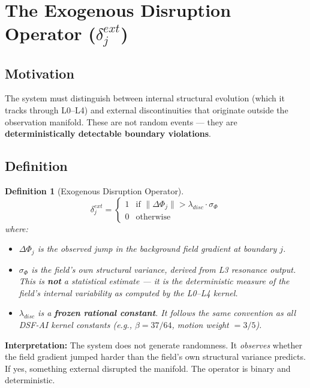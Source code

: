 \documentclass[11pt, a4paper]{article}
\newtheorem{definition}{Definition}[section]
\begin{document}
\section{The Exogenous Disruption Operator ($\delta_j^{ext}$)}

\subsection{Motivation}

The system must distinguish between internal structural evolution (which it
tracks through L0--L4) and external discontinuities that originate outside
the observation manifold. These are not random events --- they are
\textbf{deterministically detectable boundary violations}.

\subsection{Definition}

\begin{definition}[Exogenous Disruption Operator]
\begin{equation}
  \delta_j^{ext} = \begin{cases}
    1 & \text{if } \|\Delta \Phi_j\| > \lambda_{disc} \cdot \sigma_{\Phi} \\
    0 & \text{otherwise}
  \end{cases}
  \label{eq:delta}
\end{equation}
where:
\begin{itemize}[nosep]
  \item $\Delta \Phi_j$ is the observed jump in the background field gradient
        at boundary $j$.
  \item $\sigma_{\Phi}$ is the field's own structural variance, derived from
        L3 resonance output. This is \textbf{not} a statistical estimate ---
        it is the deterministic measure of the field's internal variability
        as computed by the L0--L4 kernel.
  \item $\lambda_{disc}$ is a \textbf{frozen rational constant}. It follows
        the same convention as all DSF-AI kernel constants (e.g.,
        $\beta = 37/64$, motion weight $= 3/5$).
\end{itemize}
\end{definition}

\textbf{Interpretation:} The system does not generate randomness. It
\textit{observes} whether the field gradient jumped harder than the field's
own structural variance predicts. If yes, something external disrupted the
manifold. The operator is binary and deterministic.
\end{document}
